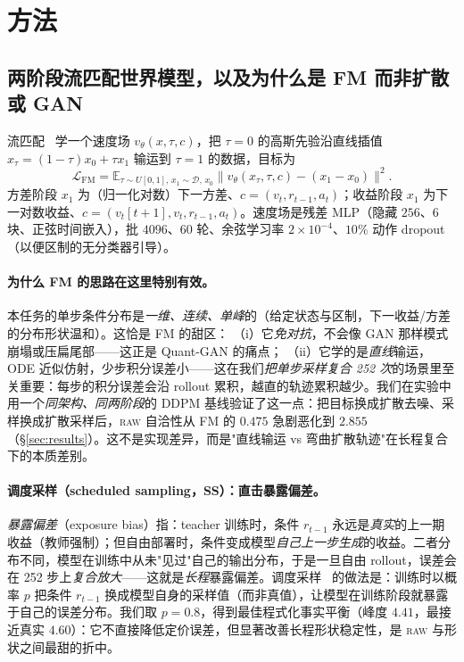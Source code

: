 \documentclass[11pt]{ctexart}
\newcommand{\raw}{\textsc{raw}}
\newcommand{\vt}{v_t}
\newcommand{\E}{\mathbb{E}}
\begin{document}
\section{方法}
\label{sec:method}

\subsection{两阶段流匹配世界模型，以及为什么是 FM 而非扩散或 GAN}
\label{sec:teacher}
流匹配~\citep{lipman2023flow} 学一个速度场 $v_\theta(x,\tau,c)$，把 $\tau{=}0$ 的高斯先验沿直线插值 $x_\tau=(1-\tau)x_0+\tau x_1$ 输运到 $\tau{=}1$ 的数据，目标为
\begin{equation}
\mathcal L_{\mathrm{FM}}
= \E_{\tau\sim U[0,1],\,x_1\sim\mathcal D,\,x_0}
\big\| v_\theta(x_\tau,\tau,c) - (x_1-x_0) \big\|^2 .
\end{equation}
方差阶段 $x_1$ 为（归一化对数）下一方差、$c=(\vt, r_{t-1}, a_t)$；收益阶段 $x_1$ 为下一对数收益、$c=(\vt[t{+}1],\vt, r_{t-1}, a_t)$。速度场是残差 MLP（隐藏 $256$、$6$ 块、正弦时间嵌入），批 $4096$、$60$ 轮、余弦学习率 $2\!\times\!10^{-4}$、$10\%$ 动作 dropout（以便区制的无分类器引导）。

\paragraph{为什么 FM 的思路在这里特别有效。}本任务的单步条件分布是\emph{一维、连续、单峰}的（给定状态与区制，下一收益/方差的分布形状温和）。这恰是 FM 的甜区：
（i）它\emph{免对抗}，不会像 GAN 那样模式崩塌或压扁尾部——这正是 Quant-GAN 的痛点；
（ii）它学的是\emph{直线}输运，ODE 近似仿射，少步积分误差小——这在我们\emph{把单步采样复合 252 次}的场景里至关重要：每步的积分误差会沿 rollout 累积，越直的轨迹累积越少。我们在实验中用一个\emph{同架构、同两阶段}的 DDPM 基线验证了这一点：把目标换成扩散去噪、采样换成扩散采样后，\raw{} 自洽性从 FM 的 $0.475$ 急剧恶化到 $2.855$（\S\ref{sec:results}）。这不是实现差异，而是"直线输运 vs 弯曲扩散轨迹"在长程复合下的本质差别。

\paragraph{调度采样（scheduled sampling，SS）：直击暴露偏差。}
\emph{暴露偏差}（exposure bias）指：teacher 训练时，条件 $r_{t-1}$ 永远是\emph{真实}的上一期收益（教师强制）；但自由部署时，条件变成模型\emph{自己上一步生成}的收益。二者分布不同，模型在训练中从未"见过"自己的输出分布，于是一旦自由 rollout，误差会在 252 步上\emph{复合放大}——这就是\emph{长程}暴露偏差。调度采样~\citep{bengio2015scheduled} 的做法是：训练时以概率 $p$ 把条件 $r_{t-1}$ 换成模型自身的采样值（而非真值），让模型在训练阶段就暴露于自己的误差分布。我们取 $p{=}0.8$，得到最佳程式化事实平衡（峰度 $4.41$，最接近真实 $4.60$）：它不直接降低定价误差，但显著改善长程形状稳定性，是 \raw{} 与形状之间最甜的折中。
\end{document}
